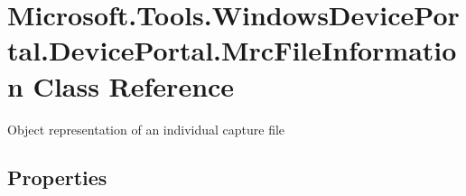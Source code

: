 \hypertarget{class_microsoft_1_1_tools_1_1_windows_device_portal_1_1_device_portal_1_1_mrc_file_information}{}\section{Microsoft.\+Tools.\+Windows\+Device\+Portal.\+Device\+Portal.\+Mrc\+File\+Information Class Reference}
\label{class_microsoft_1_1_tools_1_1_windows_device_portal_1_1_device_portal_1_1_mrc_file_information}


Object representation of an individual capture file  


\subsection*{Properties}
